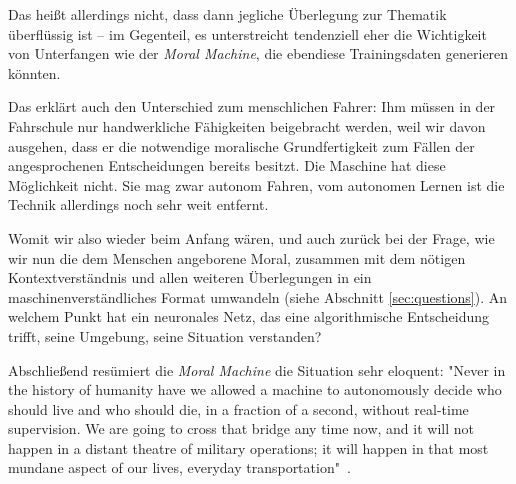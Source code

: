 \documentclass[twocolumn, german]{tum-article}
\begin{document}
Das heißt allerdings nicht, dass dann jegliche Überlegung zur Thematik überflüssig ist -- im Gegenteil, es unterstreicht tendenziell eher die Wichtigkeit von Unterfangen wie der \emph{Moral Machine}, die ebendiese Trainingsdaten generieren könnten.

Das erklärt auch den Unterschied zum menschlichen Fahrer:
Ihm müssen in der Fahrschule nur handwerkliche Fähigkeiten beigebracht werden, weil wir davon ausgehen, dass er die notwendige moralische Grundfertigkeit zum Fällen der angesprochenen Entscheidungen bereits besitzt.
Die Maschine hat diese Möglichkeit nicht.
Sie mag zwar autonom Fahren, vom autonomen Lernen ist die Technik allerdings noch sehr weit entfernt.

Womit wir also wieder beim Anfang wären, und auch zurück bei der Frage, wie wir nun die dem Menschen angeborene Moral, zusammen mit dem nötigen Kontextverständnis und allen weiteren Überlegungen in ein maschinenverständliches Format umwandeln (siehe Abschnitt \ref{sec:questions}).
An welchem Punkt hat ein neuronales Netz, das eine algorithmische Entscheidung trifft, seine Umgebung, seine Situation verstanden?

Abschließend resümiert die \emph{Moral Machine} die Situation sehr eloquent:
"Never in the history of humanity have we allowed a machine to autonomously decide who should live and who should die, in a fraction of a second, without real-time supervision. We are going to cross that bridge any time now, and it will not happen in a distant theatre of military operations; it will happen in that most mundane aspect of our lives, everyday transportation"~\cite[S. 63]{moral-machine}.

\clearpage
\printbibliography
\end{document}
